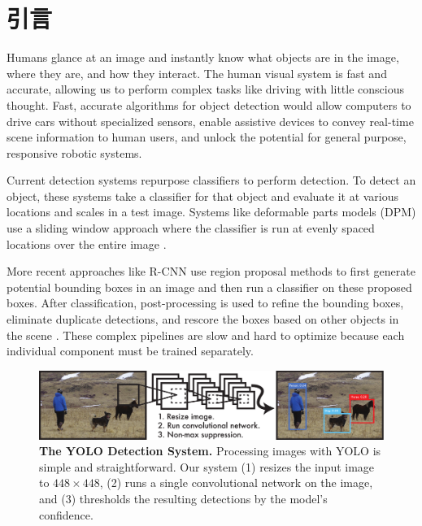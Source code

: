 \documentclass[10pt,twocolumn,letterpaper]{article}
\begin{document}
\section{引言}

Humans glance at an image and instantly know what objects are in the image, where they are, and how they interact. The human visual system is fast and accurate, allowing us to perform complex tasks like driving with little conscious thought. Fast, accurate algorithms for object detection would allow computers to drive cars without specialized sensors, enable assistive devices to convey real-time scene information to human users, and unlock the potential for general purpose, responsive robotic systems.
%

Current detection systems repurpose classifiers to perform detection. To detect an object, these systems take a classifier for that object and evaluate it at various locations and scales in a test image. Systems like deformable parts models (DPM) use a sliding window approach where the classifier is run at evenly spaced locations over the entire image \cite{lsvm-pami}.

More recent approaches like R-CNN use region proposal methods to first generate potential bounding boxes in an image and then run a classifier on these proposed boxes. After classification, post-processing is used to refine the bounding boxes, eliminate duplicate detections, and rescore the boxes based on other objects in the scene \cite{girshick2014rich}. These complex pipelines are slow and hard to optimize because each individual component must be trained separately.

\begin{figure}[t]
\begin{center}
        \includegraphics[width=\linewidth]{system}
\end{center}
   \caption{\small \textbf{The YOLO Detection System.} Processing images with YOLO is simple and straightforward. Our system (1) resizes the input image to $448 \times 448$, (2) runs a single convolutional network on the image, and (3) thresholds the resulting detections by the model's confidence.}
\label{system}
\end{figure}
\end{document}
